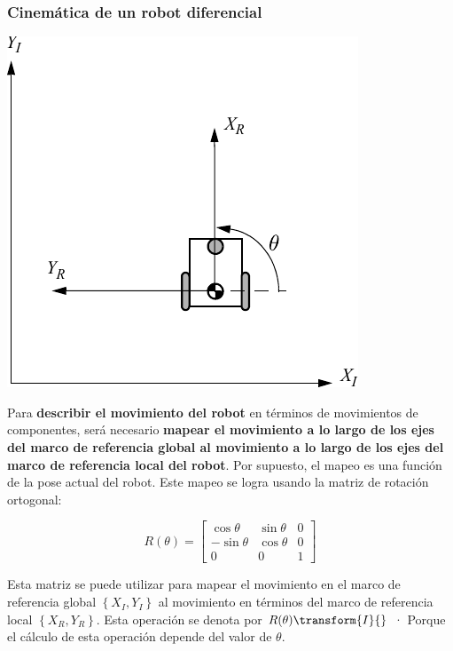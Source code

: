 \begin{frame}
    \frametitle{Cinemática de un robot diferencial}
    \small
    \begin{center}
        \includegraphics[width=0.2\columnwidth]{./images/coordinate_frame_rotation.pdf}
    \end{center}

    Para {\bf describir el movimiento del robot} en términos de movimientos de componentes, será necesario {\bf mapear el movimiento a lo largo de los ejes del marco de referencia global al movimiento a lo largo de los ejes del marco de referencia local del robot}. Por supuesto, el mapeo es una función de la pose actual del robot. Este mapeo se logra usando la matriz de rotación ortogonal:

    \begin{equation*}
    R(\theta)=
    \begin{bmatrix}
        \cos\theta & \sin\theta & 0\\
        -\sin \theta & \cos \theta & 0\\
        0 & 0 & 1
    \end{bmatrix}
\end{equation*}

    Esta matriz se puede utilizar para mapear el movimiento en el marco de referencia global $\left\lbrace X_I,Y_I \right\rbrace$ al movimiento en términos del marco de referencia local $\left\lbrace X_R,Y_R \right\rbrace$. Esta operación se denota por $R(\theta)\transform{I}{}$ · Porque el cálculo de esta operación depende del valor de $\theta$.
\end{frame}

